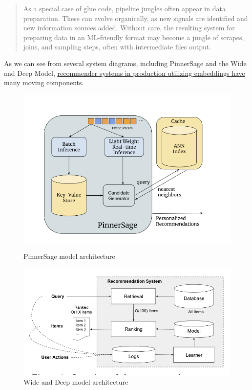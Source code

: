 \documentclass[11pt, table]{diazessay} %
\begin{document}
\begin{sloppypar}
\begin{quote}
As a special case of glue code, pipeline jungles often appear in data preparation. These can evolve organically, as new signals are identified and new information sources added. Without care, the resulting system for preparing data in an ML-friendly format may become a jungle of scrapes, joins, and sampling steps, often with intermediate files output.
\end{quote}

As we can see from several system diagrams, including PinnerSage and the Wide and Deep Model, \href{https://amatriain.net/blog/RecsysArchitectures}{recommender systems in production utilizing embeddings have} many moving components.


\begin{figure}[H]
  \centering
  \begin{minipage}[b]{0.4\textwidth}
	\includegraphics[width=\textwidth]{figures/pinnersage.png}
	\caption{PinnerSage model architecture \citep{pal2020pinnersage}}
  \end{minipage}
  \hfill
  \begin{minipage}[b]{0.4\textwidth}
	\includegraphics[width=\textwidth]{figures/wideanddeep_arch.png}
	\caption{Wide and Deep model architecture \citep{cheng2016wide}}
  \end{minipage}
\end{figure}


\end{sloppypar}
\end{document}
